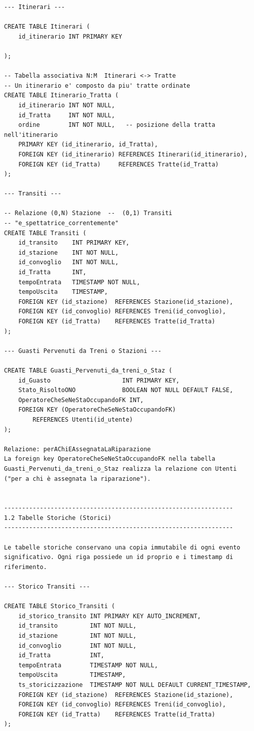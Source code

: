 \documentclass[11pt]{article}
\begin{document}
\begin{verbatim}
--- Itinerari ---

CREATE TABLE Itinerari (
    id_itinerario INT PRIMARY KEY

);

-- Tabella associativa N:M  Itinerari <-> Tratte
-- Un itinerario e' composto da piu' tratte ordinate
CREATE TABLE Itinerario_Tratta (
    id_itinerario INT NOT NULL,
    id_Tratta     INT NOT NULL,
    ordine        INT NOT NULL,   -- posizione della tratta nell'itinerario
    PRIMARY KEY (id_itinerario, id_Tratta),
    FOREIGN KEY (id_itinerario) REFERENCES Itinerari(id_itinerario),
    FOREIGN KEY (id_Tratta)     REFERENCES Tratte(id_Tratta)
);

--- Transiti ---

-- Relazione (0,N) Stazione  --  (0,1) Transiti
-- "e_spettatrice_correntemente"
CREATE TABLE Transiti (
    id_transito    INT PRIMARY KEY,
    id_stazione    INT NOT NULL,
    id_convoglio   INT NOT NULL,
    id_Tratta      INT,
    tempoEntrata   TIMESTAMP NOT NULL,
    tempoUscita    TIMESTAMP,
    FOREIGN KEY (id_stazione)  REFERENCES Stazione(id_stazione),
    FOREIGN KEY (id_convoglio) REFERENCES Treni(id_convoglio),
    FOREIGN KEY (id_Tratta)    REFERENCES Tratte(id_Tratta)
);

--- Guasti Pervenuti da Treni o Stazioni ---

CREATE TABLE Guasti_Pervenuti_da_treni_o_Staz (
    id_Guasto                    INT PRIMARY KEY,
    Stato_RisoltoONO             BOOLEAN NOT NULL DEFAULT FALSE,
    OperatoreCheSeNeStaOccupandoFK INT,
    FOREIGN KEY (OperatoreCheSeNeStaOccupandoFK)
        REFERENCES Utenti(id_utente)
);

Relazione: perAChiEAssegnataLaRiparazione
La foreign key OperatoreCheSeNeStaOccupandoFK nella tabella
Guasti_Pervenuti_da_treni_o_Staz realizza la relazione con Utenti
("per a chi è assegnata la riparazione").


----------------------------------------------------------------
1.2 Tabelle Storiche (Storici)
----------------------------------------------------------------

Le tabelle storiche conservano una copia immutabile di ogni evento
significativo. Ogni riga possiede un id proprio e i timestamp di
riferimento.

--- Storico Transiti ---

CREATE TABLE Storico_Transiti (
    id_storico_transito INT PRIMARY KEY AUTO_INCREMENT,
    id_transito         INT NOT NULL,
    id_stazione         INT NOT NULL,
    id_convoglio        INT NOT NULL,
    id_Tratta           INT,
    tempoEntrata        TIMESTAMP NOT NULL,
    tempoUscita         TIMESTAMP,
    ts_storicizzazione  TIMESTAMP NOT NULL DEFAULT CURRENT_TIMESTAMP,
    FOREIGN KEY (id_stazione)  REFERENCES Stazione(id_stazione),
    FOREIGN KEY (id_convoglio) REFERENCES Treni(id_convoglio),
    FOREIGN KEY (id_Tratta)    REFERENCES Tratte(id_Tratta)
);


\end{verbatim}
\end{document}
